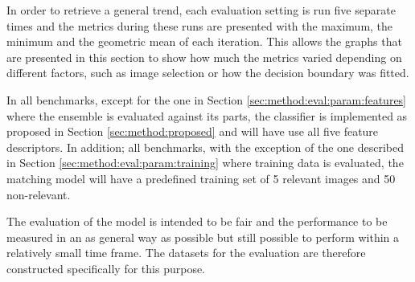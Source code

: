 In order to retrieve a general trend, each evaluation setting is run five separate times and the metrics during these runs are presented with the maximum, the minimum and the geometric mean of each iteration. This allows the graphs that are presented in this section to show how much the metrics varied depending on different factors, such as image selection or how the decision boundary was fitted.

In all benchmarks, except for the one in Section \ref{sec:method:eval:param:features} where the ensemble is evaluated against its parts, the classifier is implemented as proposed in Section \ref{sec:method:proposed} and will have use all five feature descriptors. In addition; all benchmarks, with the exception of the one described in Section \ref{sec:method:eval:param:training} where training data is evaluated, the matching model will have a predefined training set of 5 relevant images and 50 non-relevant.

The evaluation of the model is intended to be fair and the performance to be measured in an as general way as possible but still possible to perform within a relatively small time frame. The datasets for the evaluation are therefore constructed specifically for this purpose. 






